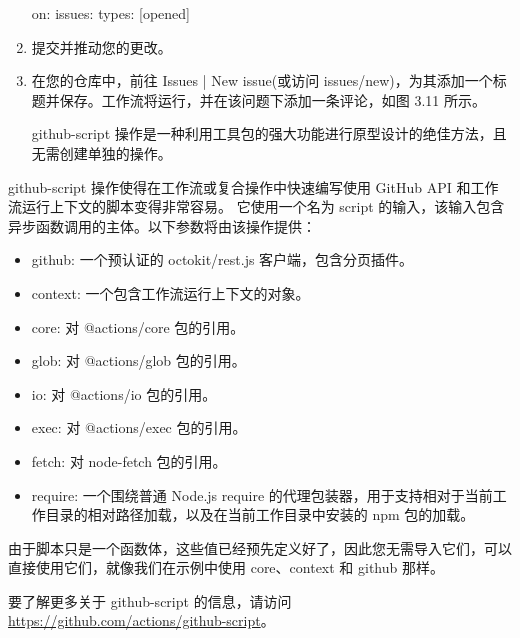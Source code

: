 \begin{enumerate}
\begin{shell}
on:
  issues:
    types: [opened]
\end{shell}

\item 
提交并推动您的更改。

\item 
在您的仓库中，前往 Issues | New issue(或访问 issues/new)，为其添加一个标题并保存。工作流将运行，并在该问题下添加一条评论，如图 3.11 所示。


github-script 操作是一种利用工具包的强大功能进行原型设计的绝佳方法，且无需创建单独的操作。
\end{enumerate}


github-script 操作使得在工作流或复合操作中快速编写使用 GitHub API 和工作流运行上下文的脚本变得非常容易。 它使用一个名为 script 的输入，该输入包含异步函数调用的主体。以下参数将由该操作提供：

\begin{itemize}
\item 
github: 一个预认证的 octokit/rest.js 客户端，包含分页插件。

\item 
context: 一个包含工作流运行上下文的对象。

\item 
core: 对 @actions/core 包的引用。

\item 
glob: 对 @actions/glob 包的引用。

\item 
io: 对 @actions/io 包的引用。

\item 
exec: 对 @actions/exec 包的引用。

\item 
fetch: 对 node-fetch 包的引用。

\item 
require: 一个围绕普通 Node.js require 的代理包装器，用于支持相对于当前工作目录的相对路径加载，以及在当前工作目录中安装的 npm 包的加载。
\end{itemize}

由于脚本只是一个函数体，这些值已经预先定义好了，因此您无需导入它们，可以直接使用它们，就像我们在示例中使用 core、context 和 github 那样。

要了解更多关于 github-script 的信息，请访问 \url{https://github.com/actions/github-script}。

